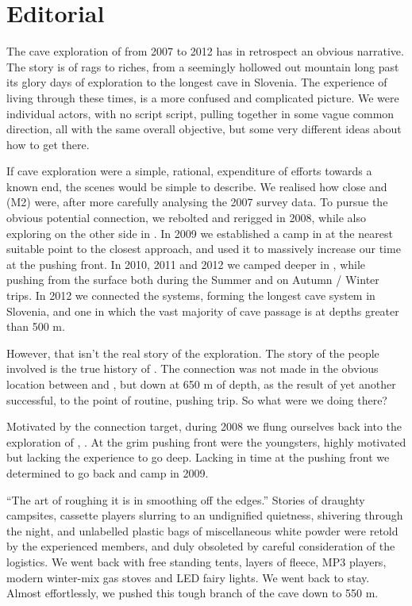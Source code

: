 \chapter*{Editorial}

The cave exploration of  from 2007 to 2012 has in
retrospect an obvious narrative. The story is of rags to riches, from a
seemingly hollowed out mountain long past its glory days of exploration
to the longest cave in Slovenia. The experience of living through these
times, is a more confused and complicated picture. We were individual
actors, with no script script, pulling together in some vague common
direction, all with the same overall objective, but some very different
ideas about how to get there.

If cave exploration were a simple, rational, expenditure of efforts
towards a known end, the scenes would be simple to describe. We realised
how close  and  (M2) were, after more
carefully analysing the 2007  survey data. To pursue
the obvious potential connection, we rebolted and rerigged 
in 2008, while also exploring on the other side in . In 2009 we established a camp in  at the nearest suitable point to the closest approach, and used it to massively increase our time at the pushing front. In 2010, 2011 and 2012 we camped deeper in ,
while pushing  from the surface both during the Summer and on
Autumn / Winter trips. In 2012 we connected the systems, forming the
longest cave system in Slovenia, and one in which the vast majority of
cave passage is at depths greater than 500 m.

However, that isn't the real story of the exploration. The story of the
people involved is the true history of . The connection was not
made in the obvious location between  and , but down
at 650 m of depth, as the result of yet another successful, to the point
of routine, pushing trip. So what were we doing there?

Motivated by the connection target, during 2008 we flung ourselves back
into the exploration of , . At the grim pushing front were the youngsters, highly motivated but lacking the experience to go deep. Lacking in time at the pushing front we determined to go back and camp in 2009. 

``The art of roughing it is in smoothing off the edges.'' Stories of draughty campsites, cassette players slurring to an undignified
quietness, shivering through the night, and unlabelled plastic bags of
miscellaneous white powder were retold by the experienced members, and
duly obsoleted by careful consideration of the logistics. We went back
with free standing tents, layers of fleece, MP3 players, modern
winter-mix gas stoves and LED fairy lights. We went back to stay. Almost
effortlessly, we pushed this tough branch of the cave down to 550 m.

